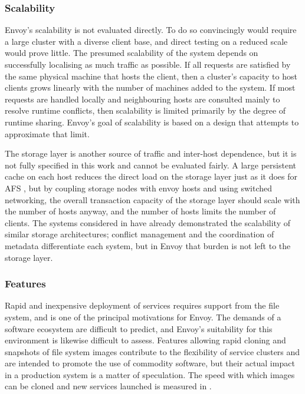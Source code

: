 \subsubsection{Scalability}

Envoy's scalability is not evaluated directly. To do so convincingly would require a large cluster with a diverse client base, and direct testing on a reduced scale would prove little. The presumed scalability of the system depends on successfully localising as much traffic as possible. If all requests are satisfied by the same physical machine that hosts the client, then a cluster's capacity to host clients grows linearly with the number of machines added to the system. If most requests are handled locally and neighbouring hosts are consulted mainly to resolve runtime conflicts, then scalability is limited primarily by the degree of runtime sharing. Envoy's goal of scalability is based on a design that attempts to approximate that limit.

The storage layer is another source of traffic and inter-host dependence, but it is not fully specified in this work and cannot be evaluated fairly. A large persistent cache on each host reduces the direct load on the storage layer just as it does for AFS \cite{satyanarayanan85}, but by coupling storage nodes with envoy hosts and using switched networking, the overall transaction capacity of the storage layer should scale with the number of hosts anyway, and the number of hosts limits the number of clients. The systems considered in  have already demonstrated the scalability of similar storage architectures; conflict management and the coordination of metadata differentiate each system, but in Envoy that burden is not left to the storage layer.

\subsubsection{Features}

Rapid and inexpensive deployment of services requires support from the file system, and is one of the principal motivations for Envoy. The demands of a software ecosystem are difficult to predict, and Envoy's suitability for this environment is likewise difficult to assess. Features allowing rapid cloning and snapshots of file system images contribute to the flexibility of service clusters and are intended to promote the use of commodity software, but their actual impact in a production system is a matter of speculation. The speed with which images can be cloned and new services launched is measured in .

